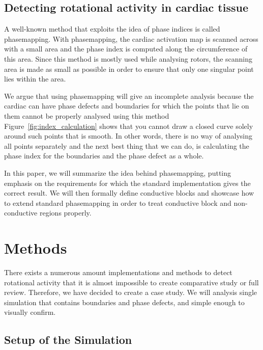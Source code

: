 \documentclass[twocolumn]{article}
\begin{document}
\subsection{Detecting rotational activity in cardiac
tissue}\label{detecting-rotational-activity-in-cardiac-tissue}

A well-known method that exploits the idea of phase indices is called
phasemapping. With phasemapping, the cardiac activation map is scanned
across with a small area and the phase index is computed along the
circumference of this area. Since this method is mostly used while
analysing rotors, the scanning area is made as small as possible in
order to ensure that only one singular point lies within the area.

We argue that using phasemapping will give an incomplete analysis
because the cardiac can have phase defects and boundaries for which the
points that lie on them cannot be properly analysed using this method
Figure~\ref{fig:index_calculation} shows that you cannot draw a
closed curve solely around
such points that is smooth. In other words, there is no way of analysing
all points separately and the next best thing that we can do, is
calculating the phase index for the boundaries and the phase defect as a
whole.

\vspace{2em}

\noindent In this paper, we will summarize the idea behind phasemapping, putting
emphasis on the requirements for which the standard implementation gives
the correct result. We will then formally define conductive blocks and
showcase how to extend standard phasemapping in order to treat
conductive block and non-conductive regions properly.

\section{Methods}\label{methods}

There exists a numerous amount implementations and methods to detect
rotational activity \autocite{pikunov2023the, gurevich2019robust,
li2020standardizing}
that it is almost impossible to create
comparative study or full review. Therefore, we have decided to create a
case study. We will analysis single simulation that contains boundaries
and phase defects, and simple enough to visually confirm.

\subsection{Setup of the Simulation}\label{setup-of-the-simulation}
\end{document}
